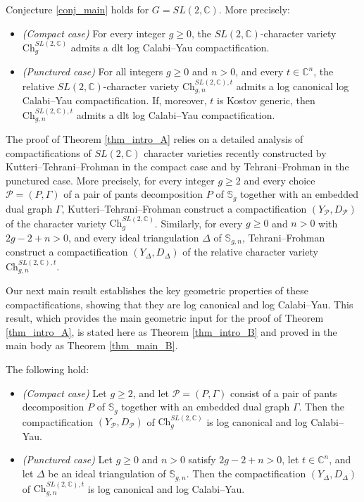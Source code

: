 \documentclass[12pt,letterpaper, reqno]{amsart}
\theoremstyle{defstyle} \newtheorem{definition}[theorem]{Definition}
\theoremstyle{remark}
\numberwithin{equation}{section}
\numberwithin{figure}{section}
\newcommand{\CC} {\mathbb{C}}
\newcommand{\bS} {\mathbb{S}}
\newcommand{\cP} {\mathcal{P}}
\begin{document}
\begin{citedthm}
\label{thm_intro_A}
Conjecture \ref{conj_main} holds for $G=SL(2,\CC)$. More precisely:
\begin{itemize}
\item[(i)] \emph{(Compact case)}
For every integer $g\geq 0$, the $SL(2,\CC)$-character variety $\mathrm{Ch}_g^{SL(2,\CC)}$ admits a dlt log Calabi--Yau compactification.

\item[(ii)] \emph{(Punctured case)}
For all integers $g\geq 0$ and $n>0$, and every $t\in\CC^n$, the relative $SL(2,\CC)$-character variety $\mathrm{Ch}_{g,n}^{SL(2,\CC),t}$ admits a log canonical log Calabi--Yau compactification. If, moreover, $t$ is Kostov generic, then $\mathrm{Ch}_{g,n}^{SL(2,\CC),t}$ admits a dlt log Calabi--Yau compactification.
\end{itemize}
\end{citedthm}

The proof of Theorem \ref{thm_intro_A} relies on a detailed analysis of compactifications of $SL(2,\CC)$ character varieties recently constructed by Kutteri--Tehrani--Frohman \cite{ayilliath2025geometric} in the compact case and by Tehrani--Frohman \cite{farajzadeh2023compactifications} in the punctured case. More precisely, for every integer $g\geq 2$ and every choice $\cP=(P,\Gamma)$ of a pair of pants decomposition $P$ of $\bS_g$ together with an embedded dual graph $\Gamma$, Kutteri--Tehrani--Frohman construct a compactification $(Y_\cP,D_\cP)$ of the character variety $\mathrm{Ch}_g^{SL(2,\CC)}$. Similarly, for every $g\geq 0$ and $n>0$ with $2g-2+n>0$, and every ideal triangulation $\Delta$ of $\bS_{g,n}$, Tehrani--Frohman construct a compactification $(Y_\Delta,D_\Delta)$ of the relative character variety $\mathrm{Ch}_{g,n}^{SL(2,\CC),t}$.

Our next main result establishes the key geometric properties of these compactifications, showing that they are log canonical and log Calabi--Yau. This result, which provides the main geometric input for the proof of Theorem \ref{thm_intro_A}, is stated here as Theorem \ref{thm_intro_B} and proved in the main body as Theorem \ref{thm_main_B}.





\begin{citedthm}
\label{thm_intro_B} The following hold:
\begin{itemize}
\item[(i)] \emph{(Compact case)}
Let $g\geq 2$, and let $\cP=(P,\Gamma)$ consist of a pair of pants decomposition $P$ of $\bS_g$ together with an embedded dual graph $\Gamma$. Then the compactification $(Y_\cP,D_\cP)$ of $\mathrm{Ch}_g^{SL(2,\CC)}$ is log canonical and log Calabi--Yau.

\item[(ii)] \emph{(Punctured case)}
Let $g\geq 0$ and $n>0$ satisfy $2g-2+n>0$, let $t\in\CC^n$, and let $\Delta$ be an ideal triangulation of $\bS_{g,n}$. Then the compactification $(Y_\Delta,D_\Delta)$ of $\mathrm{Ch}_{g,n}^{SL(2,\CC),t}$ is log canonical and log Calabi--Yau.
\end{itemize}
\end{citedthm}
\end{document}
